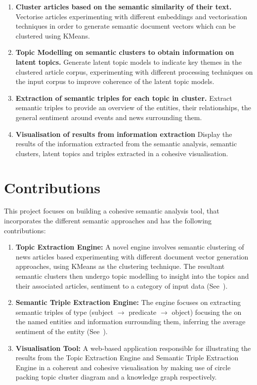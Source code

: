 \begin{enumerate}
    \item \textbf{Cluster articles based on the semantic similarity of their text.} Vectorise articles experimenting with different embeddings and vectorisation techniques in order to generate semantic document vectors which can be clustered using KMeans.  

    \item \textbf{Topic Modelling on semantic clusters to obtain information on latent topics.} Generate latent topic models to indicate key themes in the clustered article corpus, experimenting with different processing techniques on the input corpus to improve coherence of the latent topic models.

    \item \textbf{Extraction of semantic triples for each topic in cluster.} Extract semantic triples to provide an overview of the entities, their relationships, the general sentiment around events and news surrounding them.

    \item \textbf{Visualisation of results from information extraction} Display the results of the information extracted from the semantic analysis, semantic clusters, latent topics and triples extracted in a cohesive visualisation.  
    
\end{enumerate}

\section{Contributions} \label{contributions}

This project focuses on building a cohesive semantic analysis tool, that incorporates the different semantic approaches and has the following contributions: 
 
\begin{enumerate}
    \item \textbf{Topic Extraction Engine:} A novel engine involves semantic clustering of news articles based experimenting with different document vector generation approaches, using KMeans as the clustering technique. The resultant semantic clusters then undergo topic modelling to insight into the topics and their associated articles, sentiment to a category of input data (See~).

    \item \textbf{Semantic Triple Extraction Engine:} The engine focuses on extracting semantic triples of type (subject $\rightarrow$ predicate $\rightarrow$ object) focusing the on the named entities and information surrounding them, inferring the average sentiment of the entity (See~).
  
    \item \textbf{Visualisation Tool:} A web-based application responsible for illustrating the results from the Topic Extraction Engine and Semantic Triple Extraction Engine in a coherent and cohesive visualisation by making use of circle packing topic cluster diagram and a knowledge graph respectively. 


\end{enumerate}


